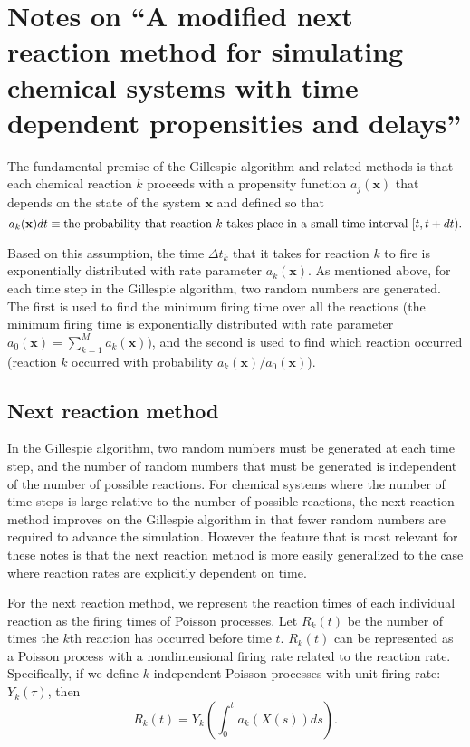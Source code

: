 \documentclass{article}
\newcommand{\dd}{d}
\newcommand{\tn}{\textnormal}
\begin{document}
\section{Notes on ``A modified next reaction method for simulating
  chemical systems with time dependent propensities and delays''}
\label{sec:notes-modified-nrm}

The fundamental premise of the Gillespie algorithm and related methods
is that each chemical reaction $k$ proceeds with a propensity function
$a_j(\mathbf{x})$ that depends on the state of the system $\mathbf{x}$
and defined so that
\begin{equation}
  \label{eq:prop-def}
  a_k(\mathbf{x}) \dd t \equiv \tn{the probability that reaction $k$
    takes place in a small time interval $[t, t+\dd t)$}.
\end{equation}

Based on this assumption, the time $\Delta t_k$ that it takes for
reaction $k$ to fire is exponentially distributed with rate parameter
$a_k(\mathbf{x})$. As mentioned above, for each time step in the
Gillespie algorithm, two random numbers are generated. The first is
used to find the minimum firing time over all the reactions (the
minimum firing time is exponentially distributed with rate parameter
$a_0(\mathbf{x}) = \sum_{k=1}^M a_k(\mathbf{x})$), and the second is
used to find which reaction occurred (reaction $k$ occurred with
probability $a_k(\mathbf{x}) / a_0 (\mathbf{x})$).

\subsection{Next reaction method}
\label{sec:next-reaction-method}

In the Gillespie algorithm, two random numbers must be generated at
each time step, and the number of random numbers that must be
generated is independent of the number of possible reactions. For
chemical systems where the number of time steps is large relative to
the number of possible reactions, the next reaction method improves on
the Gillespie algorithm in that fewer random numbers are required to
advance the simulation. However the feature that is most relevant for
these notes is that the next reaction method is more easily
generalized to the case where reaction rates are explicitly dependent
on time.

For the next reaction method, we represent the reaction times of each
individual reaction as the firing times of Poisson processes. Let
$R_k(t)$ be the number of times the $k$th reaction has occurred before
time $t$. $R_k(t)$ can be represented as a Poisson process with a
nondimensional firing rate related to the reaction rate. Specifically,
if we define $k$ independent Poisson processes with unit firing rate:
$Y_k(\tau)$, then
\begin{equation}
  \label{eq:R-def}
  R_k(t) = Y_k\left(\int_0^t a_k(X(s)) ds \right).
\end{equation}
\end{document}
